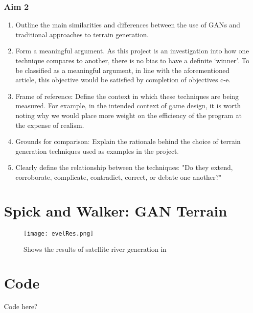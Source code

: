 \documentclass[a4paper]{report}
\begin{document}
\begin{appendices}
\subsubsection{Aim 2}
\begin{enumerate}
    \renewcommand{\theenumi}{\alph{enumi}}
    \item Outline the main similarities and differences between the use of GANs and traditional approaches to terrain generation.
    \item Form a meaningful argument. As this project is an investigation into how one technique compares to another, there is no bias to have a definite `winner'. To be classified as a meaningful argument, in line with the aforementioned article, this objective would be satisfied by completion of objectives c-e.
    \item Frame of reference: Define the context in which these techniques are being measured. For example, in the intended context of game design, it is worth noting why we would place more weight on the efficiency of the program at the expense of realism.
    \item Grounds for comparison: Explain the rationale behind the choice of terrain generation techniques used as examples in the project.
    \item Clearly define the relationship between the techniques: "Do they extend, corroborate, complicate, contradict, correct, or debate one another?"
    \end{enumerate}
\section{Spick and Walker: GAN Terrain}
\label{appendix:gan}
    \begin{figure}[H]
        \centering
            \texttt{[image: evelRes.png]}
            \caption{Shows the results of satellite river generation in \cite{riverSat}}
            \label{fig:elevRes}
    \end{figure}
\section{Code}
Code here?
\end{appendices}
\end{document}

